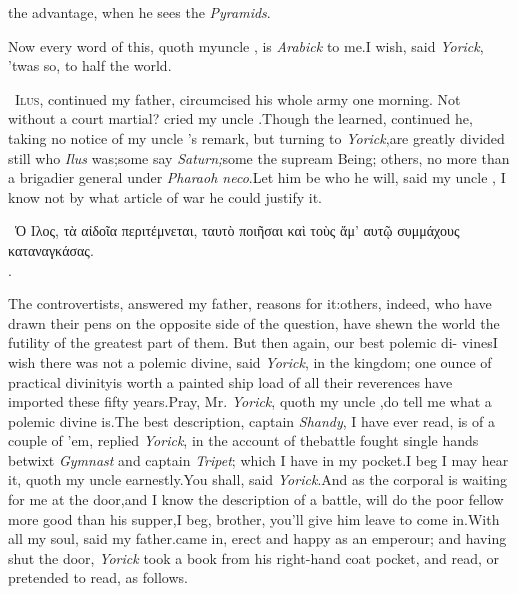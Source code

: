\documentclass[twoside]{article}
\begin{document}

\smallskip

\egroup
{}
\newpage\noindent
the advantage, when he sees the \textit{Pyramids}.\tsh

Now every word of this, quoth my\break uncle \toby, is
\textit{Arabick} to me.\tsh I wish, said \textit{Yorick},
’twas so, to half the world.

\tsk\fnast\ \textsc{Ilus}, continued my father,
circumcised his whole army one morning.\break
\tsk Not without a court martial? cried my uncle \toby.\tsh Though the learned, continued he,
taking no notice of my uncle \toby's remark, but turning to
\textit{Yo\-rick},\tsk are greatly divided still who \textit{Ilus}
was;\tsk some say \textit{Saturn;}\tsk some the supream Being;\tsk
others, no more than a brigadier general under
\textit{Pharaoh neco}.\break\tsh Let him be who he will, said my uncle
\toby, I know not by what article of war he could justify it.

\vfill
\bgroup\footnotesize
\indent\fnast\ Ὁ Ιλος, τὰ αἰδοῖα περιτέμνεται, ταυτὸ
ποιῆ\-σαι καὶ τοὺς ἅμ’ αυτῷ συμμάχους καταναγκάσας.\\
\null\hfill{}.\par
\egroup
{}
\eject

The controvertists, answered my father,  reasons for it:\tsk others, indeed, who have drawn
their pens on the opposite side of the question, have shewn the
world the futility of the greatest part of them.\tsk\break
But then again, our best polemic di-\break 
vines\tsk I wish there was not a
polemic divine, said \textit{Yorick}, in the kingdom;\tsk\break
one ounce of practical divinity\tsk is worth a painted ship load of all
their reverences have imported these fifty years.\tsk Pray, Mr.
\textit{Yorick}, quoth my uncle \toby,\tsk do tell me what a
polemic divine is.\tsh\break The best description, captain
\textit{Shandy}, I have ever read, is of a couple of ’em,
replied \textit{Yorick}, in the account of the\break battle fought single
hands betwixt \textit{Gym\-nast} and captain \textit{Tripet}; which I
have in my pocket.\tsh I beg I may hear it, quoth my uncle
\toby earnestly.\tsk You shall, said \textit{Yorick}.\tsk And as the corporal
is waiting for me at the door,\tsk and I 
know the description of a battle, will\break
do the poor fellow more good than his\break
supper,\tsk I beg, brother, you’ll give him\break
leave to come in.\tsk With all my soul,\break
said my father.\tsh \trim came in, erect\break
and happy as an emperour; and having\break
shut the door, \textit{Yorick} took a book from\break
his right-hand coat pocket, and read, or\break
pretended to read, as follows.
\end{document}
